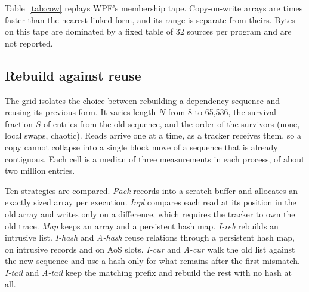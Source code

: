 \documentclass[11pt]{article}
\begin{document}
\begin{table}[tbp]
\centering
\footnotesize

\caption{Salsa's tape. Bytes are peak requested bytes per peak live entry.}
\label{tab:trace}
\end{table}

Table~\ref{tab:cow} replays WPF's membership tape. Copy-on-write arrays are \wpfCowRatio{} times faster than the nearest linked form, and its range is separate from theirs. Bytes on this tape are dominated by a fixed table of 32 sources per program and are not reported.

\begin{table}[tbp]
\centering
\footnotesize

\caption{WPF's membership tape. Linked forms freeze a snapshot during delivery.}
\label{tab:cow}
\end{table}

\subsection{Rebuild against reuse}

The grid isolates the choice between rebuilding a dependency sequence and reusing its previous form. It varies length $N$ from 8 to 65{,}536, the survival fraction $S$ of entries from the old sequence, and the order of the survivors (none, local swaps, chaotic). Reads arrive one at a time, as a tracker receives them, so a copy cannot collapse into a single block move of a sequence that is already contiguous. Each cell is a median of three measurements in each process, of about two million entries.

Ten strategies are compared. \emph{Pack} records into a scratch buffer and allocates an exactly sized array per execution. \emph{Inpl} compares each read at its position in the old array and writes only on a difference, which requires the tracker to own the old trace. \emph{Map} keeps an array and a persistent hash map. \emph{I-reb} rebuilds an intrusive list. \emph{I-hash} and \emph{A-hash} reuse relations through a persistent hash map, on intrusive records and on AoS slots. \emph{I-cur} and \emph{A-cur} walk the old list against the new sequence and use a hash only for what remains after the first mismatch. \emph{I-tail} and \emph{A-tail} keep the matching prefix and rebuild the rest with no hash at all.

\begin{table}[tbp]
\centering
\scriptsize

\caption{Nanoseconds per trace entry for a selection of cells. The full grid of \crossCells{} cells is in Appendix~\ref{app:grid}.}
\label{tab:cross}
\end{table}
\end{document}
